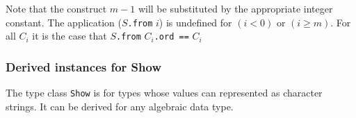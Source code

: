 Note that the construct $m-1$ will be substituted by the appropriate integer constant. The application ($S$\texttt{.from} $i$) is undefined for $(i<0)$ or $(i \ge m)$. For all $C_i$ it is the case that $S$\texttt{.from} $C_i$\texttt{.ord ==} $C_i$

\subsubsection{Derived instances for Show}

The type class \texttt{Show} is for types whose values can represented as character strings. It can be derived for any algebraic data type.

